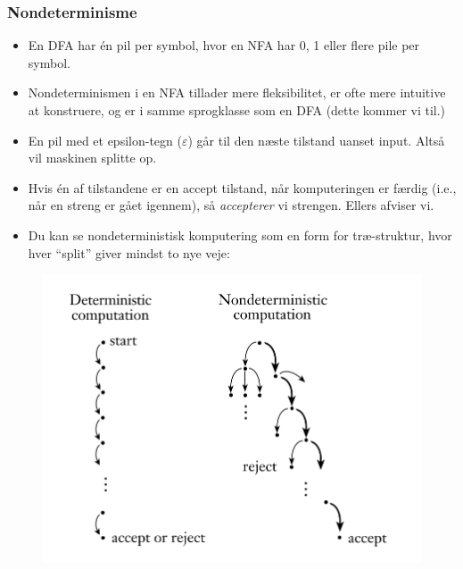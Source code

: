 \begin{frame}[allowframebreaks]
	\frametitle{Nondeterminisme}
	\begin{itemize}
		\item En DFA har én pil per symbol, hvor en NFA har 0, 1 eller flere pile per symbol.
		\item Nondeterminismen i en NFA tillader mere fleksibilitet, er ofte mere intuitive at konstruere, og er i samme sprogklasse som en DFA (dette kommer vi til.)
		\item En pil med et epsilon-tegn ($\varepsilon$) går til den næste tilstand uanset input. Altså vil maskinen splitte op.
		\item Hvis én af tilstandene er en accept tilstand, når komputeringen er færdig (i.e., når en streng er gået igennem), så \textit{accepterer} vi strengen. Ellers afviser vi.
		\item Du kan se nondeterministisk komputering som en form for træ-struktur, hvor hver ``split'' giver mindst to nye veje:
	\end{itemize}

	\begin{figure}
		\includegraphics[width=\textwidth]{figur/figure128.png}
	\end{figure}

\end{frame}


